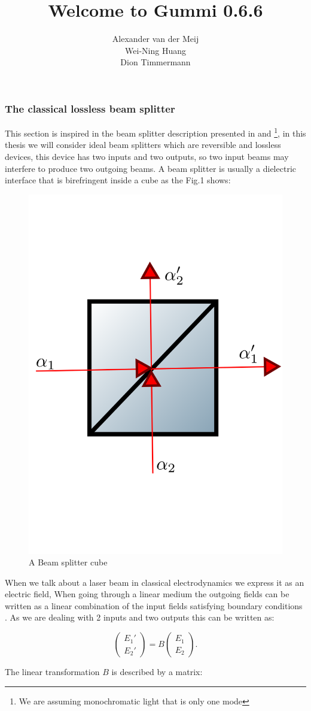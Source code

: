 \documentclass[11pt]{article}
\title{\textbf{Welcome to Gummi 0.6.6}}
\author{Alexander van der Meij\\
		Wei-Ning Huang\\
		Dion Timmermann}
\date{}
\begin{document}
\maketitle
\subsubsection{The  classical lossless beam splitter}
This section is inspired in the beam splitter description presented in \cite{Loudon} and \cite{leonhartd}\footnote{We are assuming monochromatic light that is only one mode}, in this thesis we will consider ideal beam splitters which are reversible and lossless devices, this device has two inputs and two outputs, so two input beams may interfere to produce two outgoing beams. A beam splitter is usually a dielectric interface that is birefringent inside a cube as the Fig.1 shows: 

\begin{figure}[h!]
\centering
\includegraphics[width=5 cm,height=5 cm]{images/bS.png}
\caption{A Beam splitter cube}
\label{fig:BS2}
\end{figure}

When we talk about a laser beam in classical electrodynamics we express it as an electric field, When going through a linear medium the outgoing fields can be written as a linear combination of the input fields satisfying boundary conditions \cite{jackson}. As we are dealing with 2 inputs and two outputs this can be written as:

\begin{equation}
\begin{pmatrix} E_{1}' \\ E_{2}' \end{pmatrix}=B\begin{pmatrix} E_{1} \\ E_{2} \end{pmatrix}.
\end{equation}

The linear transformation $B$ is described by a matrix:
\end{document}
